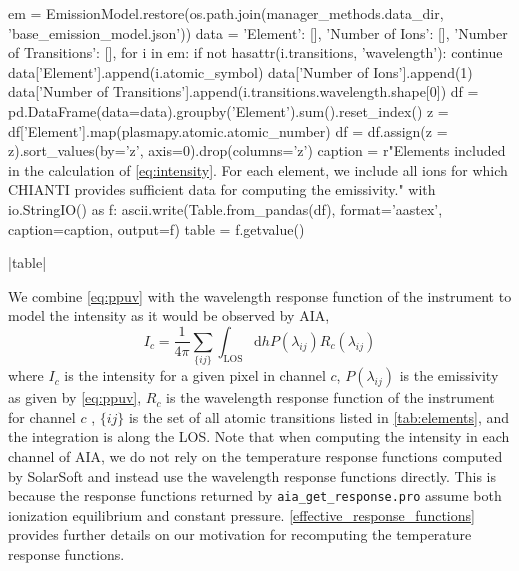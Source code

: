 \begin{pycode}
em = EmissionModel.restore(os.path.join(manager_methods.data_dir, 'base_emission_model.json'))
data = {'Element': [], 'Number of Ions': [], 'Number of Transitions': [],}
for i in em:
    if not hasattr(i.transitions, 'wavelength'):
        continue
    data['Element'].append(i.atomic_symbol)
    data['Number of Ions'].append(1)
    data['Number of Transitions'].append(i.transitions.wavelength.shape[0])
df = pd.DataFrame(data=data).groupby('Element').sum().reset_index()
z = df['Element'].map(plasmapy.atomic.atomic_number)
df = df.assign(z = z).sort_values(by='z', axis=0).drop(columns='z')
caption = r"Elements included in the calculation of \autoref{eq:intensity}. For each element, we include all ions for which CHIANTI provides sufficient data for computing the emissivity.\label{tab:elements}"
with io.StringIO() as f:
    ascii.write(Table.from_pandas(df), format='aastex', caption=caption, output=f)
    table = f.getvalue()
\end{pycode}
|table|

We combine \autoref{eq:ppuv} with the wavelength response function of the instrument to model the intensity as it would be observed by AIA,
\begin{equation}\label{eq:intensity}
    I_c = \frac{1}{4\pi}\sum_{\{ij\}}\int_{\text{LOS}}\mathrm{d}hP(\lambda_{ij})R_c(\lambda_{ij})
\end{equation}
where $I_c$ is the intensity for a given pixel in channel $c$, $P(\lambda_{ij})$ is the emissivity as given by \autoref{eq:ppuv}, $R_c$ is the wavelength response function of the instrument for channel $c$ \citep[see][]{boerner_initial_2012}, $\{ij\}$ is the set of all atomic transitions listed in \autoref{tab:elements}, and the integration is along the LOS. Note that when computing the intensity in each channel of AIA, we do not rely on the temperature response functions computed by SolarSoft \citep[SSW,][]{freeland_data_1998} and instead use the wavelength response functions directly. This is because the response functions returned by \texttt{aia\_get\_response.pro} assume both ionization equilibrium and constant pressure. \autoref{effective_response_functions} provides further details on our motivation for recomputing the temperature response functions.

